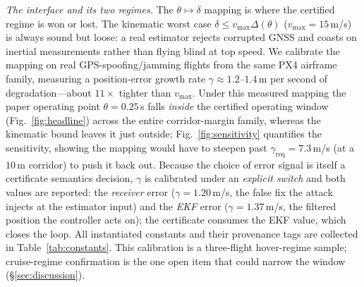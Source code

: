 \documentclass[conference]{IEEEtran}
\begin{document}
\emph{The interface and its two regimes.} The $\theta\!\mapsto\!\delta$ mapping
is where the certified regime is won or lost. The kinematic worst case
$\delta \le v_{\max}\Delta(\theta)$ ($v_{\max}=15$\,m/s) is always sound but
loose: a real estimator rejects corrupted GNSS and coasts on inertial
measurements rather than flying blind at top speed. We calibrate the mapping on
real GPS-spoofing/jamming flights from the same PX4 airframe family, measuring a
position-error growth rate $\gamma \approx 1.2$--$1.4$\,m per second of
degradation---about $11\times$ tighter than $v_{\max}$. Under this measured
mapping the paper operating point $\theta=0.25$\,s falls \emph{inside} the
certified operating window (Fig.~\ref{fig:headline}) across the entire
corridor-margin family, whereas the kinematic bound leaves it just outside;
Fig.~\ref{fig:sensitivity} quantifies the sensitivity, showing the mapping would
have to steepen past $\gamma_{\text{req}}=7.3$\,m/s (at a $10$\,m corridor) to
push it back out. Because the choice of error signal is itself a certificate
semantics decision, $\gamma$ is calibrated under an \emph{explicit switch} and
both values are reported: the \emph{receiver} error ($\gamma=1.20$\,m/s, the
false fix the attack injects at the estimator input) and the \emph{EKF} error
($\gamma=1.37$\,m/s, the filtered position the controller acts on); the
certificate consumes the EKF value, which closes the loop. All instantiated
constants and their provenance tags are collected in
Table~\ref{tab:constants}. This calibration is a three-flight hover-regime
sample; cruise-regime confirmation is the one open item that could narrow the
window (\S\ref{sec:discussion}).
\end{document}
